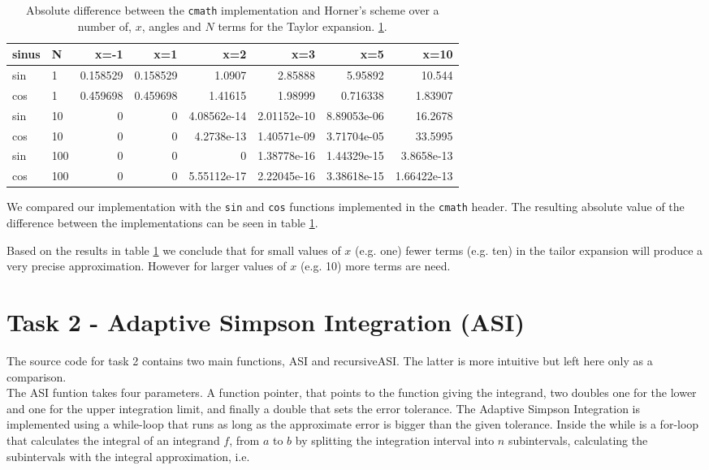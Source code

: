 \documentclass[paper=a4, fontsize=11pt]{article} %
\begin{document}
\begin{table}[H]
\begin{tabular}{ l | l | r r r r r r}
  sinus & N   & x=-1     & x=1      & x=2         & x=3         & x=5         & x=10        \\
  \hline
  sin   & 1   & 0.158529 & 0.158529 & 1.0907      & 2.85888     & 5.95892     & 10.544      \\
  cos   & 1   & 0.459698 & 0.459698 & 1.41615     & 1.98999     & 0.716338    & 1.83907     \\
  sin   & 10  & 0        & 0        & 4.08562e-14 & 2.01152e-10 & 8.89053e-06 & 16.2678     \\
  cos   & 10  & 0        & 0        & 4.2738e-13  & 1.40571e-09 & 3.71704e-05 & 33.5995     \\
  sin   & 100 & 0        & 0        & 0           & 1.38778e-16 & 1.44329e-15 & 3.8658e-13  \\
  cos   & 100 & 0        & 0        & 5.55112e-17 & 2.22045e-16 & 3.38618e-15 & 1.66422e-13 \\
\end{tabular}
\caption{ Absolute difference between the \lstinline$cmath$
  implementation and Horner's scheme over a number of, $x$, angles and
  $N$ terms for the Taylor expansion.  \ref{tab:t1-errors}.}
\label{tab:t1-errors}
\end{table}


We compared our implementation with the \lstinline$sin$ and
\lstinline$cos$ functions implemented in the \lstinline$cmath$
header. The resulting absolute value of the difference between the
implementations can be seen in table \ref{tab:t1-errors}.

Based on the results in table \ref{tab:t1-errors} we conclude that for
small values of $x$ (e.g. one) fewer terms (e.g. ten) in the tailor
expansion will produce a very precise approximation. However for
larger values of $x$ (e.g. 10) more terms are need.


\section*{Task 2 - Adaptive Simpson Integration (ASI)}


The source code for task 2 contains two main functions, ASI and recursiveASI. The latter is more intuitive but left here only as a comparison.\\

The ASI funtion takes four parameters. A function pointer, that points
to the function giving the integrand, two doubles one for the
lower and one  for the upper integration limit, and finally a double that sets the error tolerance. The Adaptive Simpson Integration is implemented using a while-loop that runs as long as the approximate error is bigger than the given tolerance. Inside the while is a for-loop that calculates the integral of an integrand $f$, from $a$ to $b$ by splitting the integration interval into $n$ subintervals, calculating the subintervals with the integral approximation, i.e.
\end{document}
